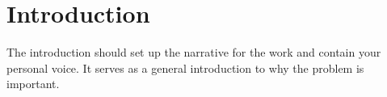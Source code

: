 \chapter{Introduction}

The introduction should set up the narrative for the work and contain your personal voice. It serves as  a general introduction to why the problem is important.
